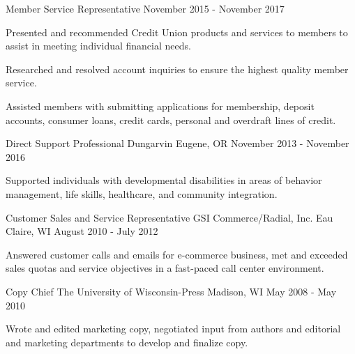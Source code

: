 \begin{cventries}
  \cventry
    {Member Service Representative} %
    {} %
    {} %
    {November 2015 - November 2017} %
    {
      \begin{cvitems} %
        \item {Presented and recommended Credit Union products and services to members to assist in meeting individual financial needs.}
        \item {Researched and resolved account inquiries to ensure the highest quality member service.}
        \item {Assisted members with submitting applications for membership, deposit accounts, consumer loans, credit cards, personal and overdraft lines of credit.}
         	\end{cvitems}
    } 
    
    \cventry
    {Direct Support Professional} %
    {Dungarvin} %
    {Eugene, OR} %
    {November 2013 - November 2016} %
    {
      \begin{cvitems} %
        \item {Supported individuals with developmental disabilities in areas of behavior management, life skills, healthcare, and community integration. }
      \end{cvitems}
    }     
    
    \cventry
    {Customer Sales and Service Representative} %
    {GSI Commerce/Radial, Inc.} %
    {Eau Claire, WI} %
    {August 2010 - July 2012} %
    {
      \begin{cvitems} %
        \item {Answered customer calls and emails for e-commerce business, met and exceeded sales quotas and service objectives in a fast-paced call center environment.}
      \end{cvitems}
    }   
     
    \cventry
    {Copy Chief}
    {The University of Wisconsin-Press}
    {Madison, WI}
    {May 2008 - May 2010}
    {\begin{cvitems}
      \item{Wrote and edited marketing copy, negotiated input from authors and editorial and marketing departments to develop and finalize copy.}
    \end{cvitems}
    }


\end{cventries}

